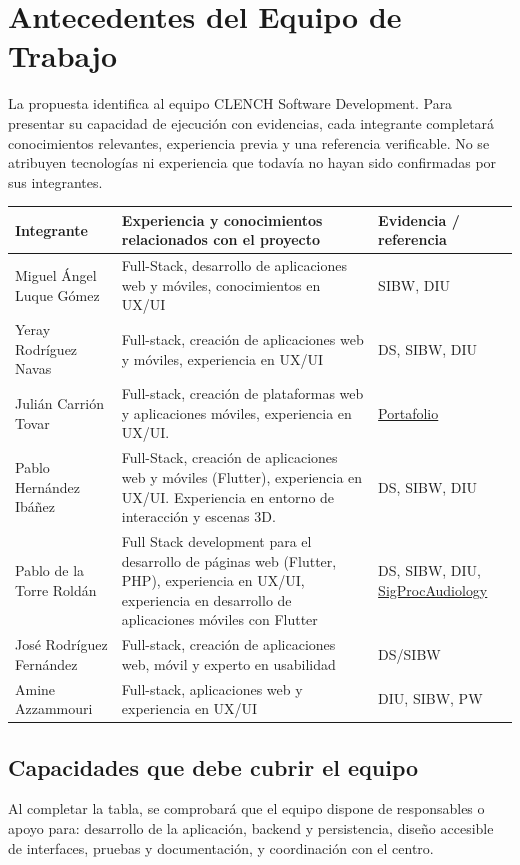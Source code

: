 \newpage
\section{Antecedentes del Equipo de Trabajo}

La propuesta identifica al equipo CLENCH Software Development. Para presentar su capacidad de ejecución con evidencias, cada integrante completará conocimientos relevantes, experiencia previa y una referencia verificable. No se atribuyen tecnologías ni experiencia que todavía no hayan sido confirmadas por sus integrantes.

\begin{center}
\small
\begin{tabularx}{\textwidth}{|p{3.5cm}|X|p{3.4cm}|}
\hline
\rowcolor{tableHeader}
Integrante & Experiencia y conocimientos relacionados con el proyecto & Evidencia / referencia \\
\hline
Miguel Ángel Luque Gómez & Full-Stack, desarrollo de aplicaciones web y móviles, conocimientos en UX/UI & SIBW, DIU\\
\hline
Yeray Rodríguez Navas & Full-stack, creación de aplicaciones web y móviles, experiencia en UX/UI & DS, SIBW, DIU \\
\hline
Julián Carrión Tovar & Full-stack, creación de plataformas web y aplicaciones móviles, experiencia en UX/UI. & \href{https://juliancarrion.dev/}{Portafolio} \\
\hline
Pablo Hernández Ibáñez & Full-Stack, creación de aplicaciones web y móviles (Flutter), experiencia en UX/UI. Experiencia en entorno de interacción y escenas 3D. & DS, SIBW, DIU\\
\hline
Pablo de la Torre Roldán & Full Stack development para el desarrollo de páginas web (Flutter, PHP), experiencia en UX/UI, experiencia en desarrollo de aplicaciones móviles con Flutter & DS, SIBW, DIU,  \href{https://wpd.ugr.es/~sig.proc.audiology/}{SigProcAudiology}\\
\hline
José Rodríguez Fernández & Full-stack, creación de aplicaciones web, móvil y experto en usabilidad & DS/SIBW \\
\hline
Amine Azzammouri & Full-stack, aplicaciones web y experiencia en UX/UI & DIU, SIBW, PW \\
\hline
\end{tabularx}
\end{center}

\subsection{Capacidades que debe cubrir el equipo}
Al completar la tabla, se comprobará que el equipo dispone de responsables o apoyo para: desarrollo de la aplicación, backend y persistencia, diseño accesible de interfaces, pruebas y documentación, y coordinación con el centro.